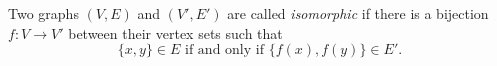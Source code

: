 

\setcounter{section}{1}
\setcounter{subsection}{3}
\setcounter{dfn}{3}

\begin{dfn}
Two graphs $(V, E)$ and $(V', E')$ are called \emph{isomorphic} if there is a bijection $f \colon V \to V'$
between their vertex sets such that
\[
\{x, y\} \in E \text{ if and only if } \{f(x), f(y)\} \in E'.
\]
\end{dfn}


